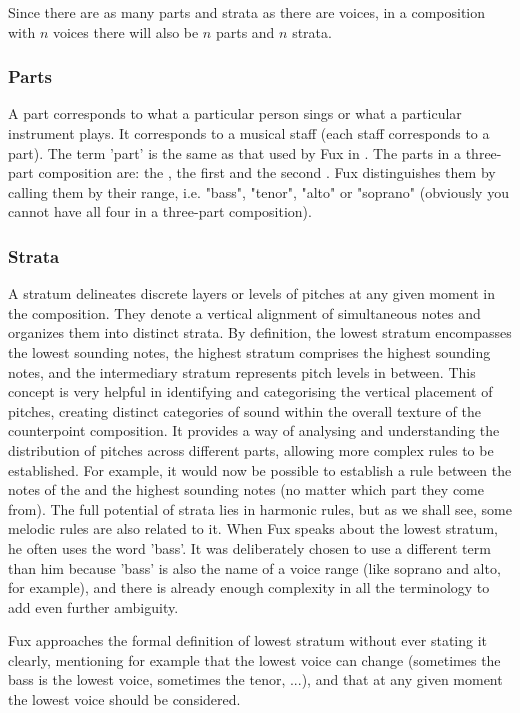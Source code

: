 Since there are as many parts and strata as there are voices, in a composition with $n$ voices there will also be $n$ parts and $n$ strata.

\subsubsection{Parts}
A part corresponds to what a particular person sings or what a particular instrument plays. It corresponds to a musical staff (each staff corresponds to a part). The term 'part' is the same as that used by Fux in \gap. The parts in a three-part composition are: the \cf, the first \cps and the second \cp. Fux distinguishes them by calling them by their range, i.e. "bass", "tenor", "alto" or "soprano" (obviously you cannot have all four in a three-part composition).

\subsubsection{Strata}
A stratum delineates discrete layers or levels of pitches at any given moment in the composition. They denote a vertical alignment of simultaneous notes and organizes them into distinct strata. By definition, the lowest stratum encompasses the lowest sounding notes, the highest stratum comprises the highest sounding notes, and the intermediary stratum represents pitch levels in between.
This concept is very helpful in identifying and categorising the vertical placement of pitches, creating distinct categories of sound within the overall texture of the counterpoint composition. It provides a way of analysing and understanding the distribution of pitches across different parts, allowing more complex rules to be established. For example, it would now be possible to establish a rule between the notes of the \cf and the highest sounding notes (no matter which part they come from). The full potential of strata lies in harmonic rules, but as we shall see, some melodic rules are also related to it.
When Fux speaks about the lowest stratum, he often uses the word 'bass'. It was deliberately chosen to use a different term than him because 'bass' is also the name of a voice range (like soprano and alto, for example), and there is already enough complexity in all the terminology to add even further ambiguity.

Fux approaches the formal definition of lowest stratum without ever stating it clearly, mentioning for example that the lowest voice can change (sometimes the bass is the lowest voice, sometimes the tenor, ...), and that at any given moment the lowest voice should be considered. 

